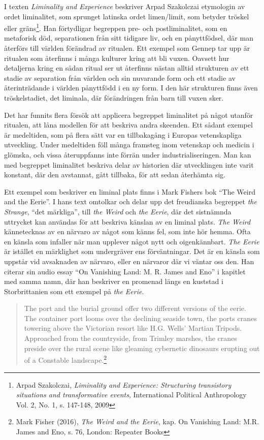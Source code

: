\documentclass{article}
\begin{document}
I texten \emph{Liminality and Experience} beskriver Arpad Szakolczai etymologin av ordet liminalitet, som
sprunget latinska ordet limen/limit, som betyder tröskel eller gräns\footnote{Arpad Szakolczai,
\emph{Liminality and Experience: Structuring transistory situations and transformative events}, International
Political Anthropology Vol. 2, No. 1, s. 147-148, 2009}. Han förtydligar begreppen pre- och postliminalitet,
som en metaforisk död, separationen från sitt tidigare liv, och en pånyttfödsel, där man återförs till världen
förändrad av ritualen. Ett exempel som Gennep tar upp är ritualen som återfinns i många kulturer kring att bli
vuxen. Oavsett hur detaljerna kring en sådan ritual ser ut återfinns nästan alltid strukturen av ett stadie av
separation från världen och sin nuvarande form och ett stadie av återinträdande i världen pånyttfödd i en ny
form. I den här strukturen finns även tröskelstadiet, det liminala, där förändringen från barn till vuxen
sker. 

Det har funnits flera försök att applicera begreppet liminalitet på något utanför ritualen, att låna modellen
för att beskriva andra skeenden. Ett sådant exempel är medeltiden, som på flera sätt var en tillbakagång i
Europas vetenskapliga utveckling. Under medeltiden föll många framsteg inom vetenskap och medicin i glömska,
och vissa återuppfanns inte förrän under industrialiseringen. Man kan med begreppet liminalitet beskriva delar
av historien där utvecklingen inte varit konstant, där den avstannat, gått tillbaka, för att sedan återhämta
sig. 

Ett exempel som beskriver en liminal plats finns i Mark Fishers bok ``The Weird and the Eerie''. I hans text
omtolkar och delar upp det freudianska begreppet \emph{the Strange}, ``det märkliga'', till \emph{the
Weird} och \emph{the Eerie}, där det sistnämnda uttrycket kan användas för att beskriva känslan av en liminal plats. 
\emph{The Weird} kännetecknas av en närvaro av något som känns fel, som inte hör hemma. Ofta en känsla som
infaller när man upplever något nytt och oigenkännbart. \emph{The Eerie} är istället en märklighet som undergräver ens
förväntningar. Det är en känsla som uppstår vid avsaknaden av närvaro, eller en närvaror där vi väntar oss
den. Han citerar sin audio essay ``On Vanishing Land: M. R. James and Eno'' i kapitlet med samma namn, där han beskriver en
promenad längs en kuststad i Storbrittanien som ett exempel på \emph{the Eerie}.

\begin{quote}
The port and the burial ground offer two different versions of the eerie. The container port looms over the
declining seaside town, the ports cranes towering above the Victorian resort like H.G. Wells' Martian Tripods.
Approached from the countryside, from Trimley marshes, the cranes preside over the rural scene like gleaming
cybernetic dinosaurs erupting out of a Constable landscape.\footnote{Mark Fisher (2016), \emph{The Weird and the
Eerie}, kap. On Vanishing Land: M.R. James and Eno, s. 76, London: Repeater Books}
\end{quote}
\end{document}
